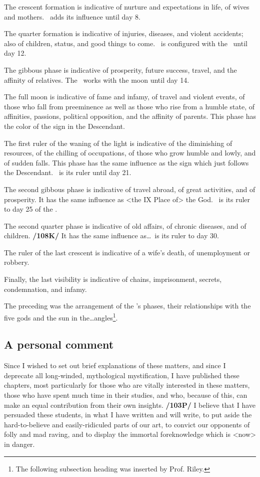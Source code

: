 The crescent formation is indicative of nurture and expectations in life, of wives and mothers. \Mercury\, adds its influence until day 8.

The quarter formation is indicative of injuries, diseases, and violent accidents; also of children, status, and good things to come. \Venus\, is configured with the \Moon\, until day 12.

The gibbous phase is indicative of prosperity, future success, travel, and the affinity of relatives. The \Sun\, works with the moon until day 14.

The full moon is indicative of fame and infamy, of travel and violent events, of those who fall from preeminence as well as those who rise from a humble state, of affinities, passions, political opposition, and the affinity of parents. This phase has the color of the sign in the Descendant.

The first ruler of the waning of the light is indicative of the diminishing of resources, of the chilling of occupations, of those who grow humble and lowly, and of sudden falls. This phase has the same influence as the sign which just follows the Descendant. \Mars\, is its ruler until day 21.

The second gibbous phase is indicative of travel abroad, of great activities, and of prosperity. It has the same influence as <the IX Place of> the God. \Jupiter\, is its ruler to day 25 of the \Moon.

The second quarter phase is indicative of old affairs, of chronic diseases, and of children. \textbf{/108K/} It has
the same influence as\ldots \Saturn\, is its ruler to day 30.

The ruler of the last crescent is indicative of a wife’s death, of unemployment or robbery. 

Finally, the last visibility is indicative of chains, imprisonment, secrets, condemnation, and infamy.

The preceding was the arrangement of the \Moon’s phases, their relationships with the five gods and the sun in the\ldots angles\footnote{The following subsection heading was inserted by Prof. Riley.}.

\subsection{\textlangle A personal comment\textrangle}

Since I wished to set out brief explanations of these matters, and since I deprecate all long-winded, mythological mystification, I have published these chapters, most particularly for those who are vitally interested in these matters, those who have spent much time in their studies, and who, because of this, can
make an equal contribution from their own insights. \textbf{/103P/} I believe that I have persuaded these students, in what I have written and will write, to put aside the hard-to-believe and easily-ridiculed parts of our art, to convict our opponents of folly and mad raving, and to display the immortal foreknowledge which is <now> in danger. 

